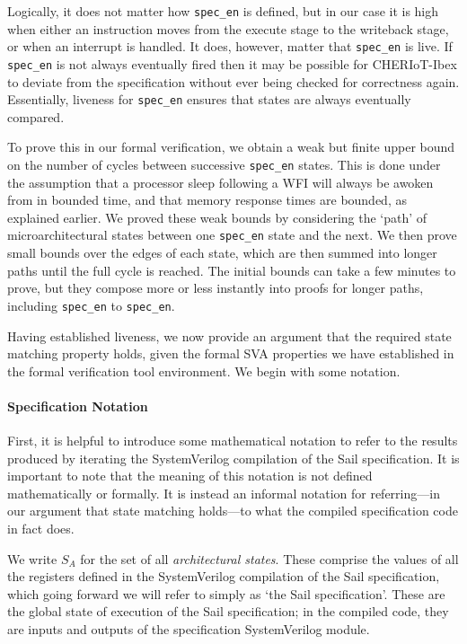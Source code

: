\documentclass[10pt,conference]{IEEEtran}
\begin{document}
Logically, it does not matter how \verb|spec_en| is defined, but in our
case it is high when either an instruction moves from the execute stage to
the writeback stage, or when an interrupt is handled.  It does, however,
matter that \verb|spec_en| is live. If \verb|spec_en| is not always
eventually fired then it may be possible for CHERIoT-Ibex to deviate from
the specification without ever being checked for correctness
again. Essentially, liveness for \verb|spec_en| ensures that states are
always eventually compared.

To prove this in our formal verification, we obtain a weak but finite upper
bound on the number of cycles between successive \verb|spec_en| states.
This is done under the assumption that a processor sleep following a WFI
will always be awoken from in bounded time, and that memory response times
are bounded, as explained earlier. We proved these weak bounds by
considering the `path' of microarchitectural states between one
\verb|spec_en| state and the next.  We then prove small bounds over the
edges of each state, which are then summed into longer paths until the full
cycle is reached.  The initial bounds can take a few minutes to prove, but
they compose more or less instantly into proofs for longer paths, including
\verb|spec_en| to \verb|spec_en|.

Having established liveness, we now provide an argument that the required
state matching property holds, given the formal SVA properties we have
established in the formal verification tool environment. We begin with some
notation.

\paragraph{Specification Notation}

First, it is helpful to introduce some mathematical notation to refer to
the results produced by iterating the SystemVerilog compilation of the Sail
specification. It is important to note that the meaning of this notation is
not defined mathematically or formally. It is instead an informal notation
for referring---in our argument that state matching holds---to what the
compiled specification code in fact does.

We write $S_A$ for the set of all \textit{architectural states}. These comprise
the values of all the registers defined in the SystemVerilog compilation of
the Sail specification, which going forward we will refer to simply as `the
Sail specification'. These are the global state of execution of the Sail
specification; in the compiled code, they are inputs and outputs of the
specification SystemVerilog module.
\end{document}
